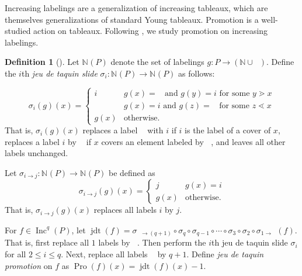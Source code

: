 \documentclass[11pt]{amsart}
\theoremstyle{definition}
\newtheorem{definition}[theorem]{Definition}
\DeclareMathOperator{\boxempty}{\boxed{ }}
\DeclareMathOperator{\Inc}{\mathrm{Inc}}
\DeclareMathOperator{\Pro}{\mathrm{Pro}}
\DeclareMathOperator{\jdt}{\mathrm{jdt}}
\begin{document}
Increasing labelings are a generalization of increasing tableaux, which are themselves generalizations of standard Young tableaux. Promotion is a well-studied action on tableaux. Following \cite{dilks2019rowmotion}, we study promotion on increasing labelings.

\begin{definition}[]
\label{def:ProJDT}
Let $\mathbb{N}_{\boxempty}(P)$ denote the set of labelings $g:P\rightarrow(\mathbb{N}\cup\boxempty)$.
Define the $i$th \emph{jeu de taquin slide} $\sigma_i:\mathbb{N}_{\boxempty}(P)\rightarrow \mathbb{N}_{\boxempty}(P)$ 
as follows: 

\[\sigma_i(g)(x)=\begin{cases}
i &  g(x)=\boxempty \mbox{ and } g(y)=i \mbox{ for some } y\gtrdot x \\
\boxempty &  g(x)=i \mbox{ and } g(z)=\boxempty \mbox{ for some } z\lessdot x\\
g(x) & \mbox{otherwise.}
\end{cases}\]
That is, $\sigma_i(g)(x)$ replaces a label $\boxempty$ with $i$ if $i$ is the label of a cover of $x$, replaces a label $i$ by $\boxempty$ if $x$ covers an element labeled by $\boxempty$, and leaves all other labels unchanged.

Let $\sigma_{i\rightarrow j}:\mathbb{N}_{\boxempty}(P)\rightarrow \mathbb{N}_{\boxempty}(P)$ be defined as \[\sigma_{i\rightarrow j}(g)(x)=\begin{cases} j & g(x)=i\\  g(x) &\mbox{otherwise}.\end{cases}\]
That is, $\sigma_{i\rightarrow j}(g)(x)$ replaces all labels $i$ by $j$. 

For $f\in\Inc^q(P)$, let $\jdt(f)=\sigma_{\boxempty\rightarrow (q+1)}\circ\sigma_{q}\circ\sigma_{q-1}\circ\cdots\circ\sigma_{3}\circ\sigma_2\circ\sigma_{1\rightarrow \boxempty}(f)$. That is, first replace all $1$ labels by $\boxempty$. Then perform the $i$th jeu de taquin slide $\sigma_i$ for all $2\leq i\leq q$. Next, replace all labels $\boxempty$ by $q+1$. 
Define \emph{jeu de taquin promotion} on $f$ as $\Pro(f)(x)=\jdt(f)(x)-1$.
\end{definition}
\end{document}
